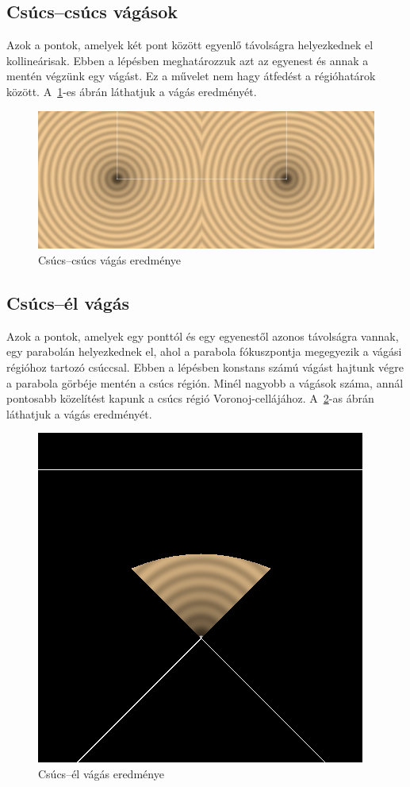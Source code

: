 \subsection{Csúcs--csúcs vágások}

Azok a pontok, amelyek két pont között egyenlő távolságra helyezkednek el kollineárisak. Ebben a lépésben meghatározzuk azt az egyenest és annak a mentén végzünk egy vágást. Ez a művelet nem hagy átfedést a régióhatárok között. A~\ref{fig:vertex_vertex_cut-1}-es ábrán láthatjuk a vágás eredményét.

\begin{figure}[H]
	\centering
	\includegraphics[width=1\linewidth]{images/vertex_vertex_cut.png}
	\caption{Csúcs--csúcs vágás eredménye}
	\label{fig:vertex_vertex_cut-1}
\end{figure}

\subsection{Csúcs--él vágás} \label{vertex_segment_cut}
Azok a pontok, amelyek egy ponttól és egy egyenestől azonos távolságra vannak, egy parabolán helyezkednek el, ahol a parabola fókuszpontja megegyezik a vágási régióhoz tartozó csúccsal. Ebben a lépésben konstans számú vágást hajtunk végre a parabola görbéje mentén a csúcs régión. Minél nagyobb a vágások száma, annál pontosabb közelítést kapunk a csúcs régió Voronoj-cellájához. A~\ref{fig:vertex_segment_cut-1}-as ábrán láthatjuk a vágás eredményét.

\begin{figure}[H]
	\centering
	\includegraphics[width=.55\linewidth]{images/vertex_segment_cut.png}
	\caption{Csúcs--él vágás eredménye}
	\label{fig:vertex_segment_cut-1}
\end{figure}

